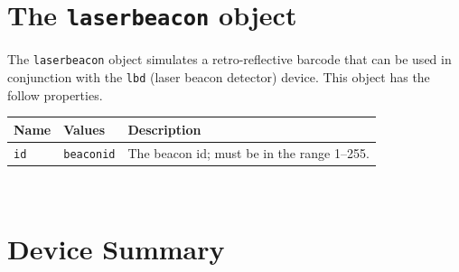 \documentclass[11pt,twoside]{report}
\begin{document}
\newpage
\section{The {\tt laserbeacon} object}

The {\tt laserbeacon} object simulates a retro-reflective barcode
that can be used in conjunction with the {\tt lbd} (laser beacon detector)
device.  This object has the follow properties.
\vspace{1em}\\\noindent
\begin{tabularx}{\columnwidth}{llX}
\hline
Name & Values & Description \\
\hline

\verb'id' & \verb'beaconid' & The beacon id; must be in the range 1--255. \\

\hline
\end{tabularx}
\vspace{1em}\\


\newpage
\section{Device Summary}
\label{sec.ref.devices}
\end{document}
